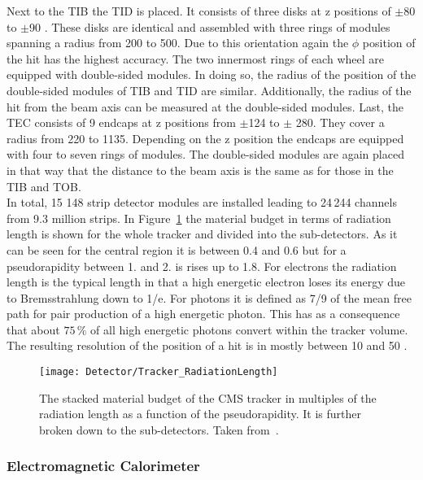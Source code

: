 Next to the TIB the TID is placed. It consists of three disks at z positions of $\pm{}$80 to $\pm$90\cm{} . These disks are identical and assembled with three rings of modules spanning a radius from 200 to 500\mm{}. Due to this orientation again the $\phi{}$ position of the hit has the highest accuracy. The two innermost rings of each wheel are equipped with double-sided modules. In doing so, the radius of the position of the double-sided modules of TIB and TID are similar. Additionally, the radius of the hit from the beam axis can be measured at the double-sided modules. Last, the TEC consists of 9 endcaps at z positions from $\pm{}$124 to $\pm{}$ 280\cm{}. They cover a radius from 220 to 1135\mm{}. Depending on the z position the endcaps are equipped with four to seven rings of modules. The double-sided modules are again placed in that way that the distance to the beam axis is the same as for those in the TIB and TOB. \\
In total, 15 148 strip detector modules are installed leading to 24\,244 channels from 9.3 million strips. In Figure~\ref{plot:LHCCMSTrackerRadiationLength} the material budget in terms of radiation length is shown for the whole tracker and divided into the sub-detectors. As it can be seen for the central region it is between 0.4 and 0.6 but for a pseudorapidity between 1. and 2. is rises up to 1.8. For electrons the radiation length is the typical length in that a high energetic electron loses its energy due to Bremsstrahlung down to 1/e. For photons it is defined as 7/9 of the mean free path for pair production of a high energetic photon. This has as a consequence that about $75\,\%$ of all high energetic photons convert within the tracker volume.\\
The resulting resolution of the position of a hit is in mostly between 10 and 50\mum{} \cite{CMS-PAPER-TRK-11-001}.

\begin{figure}[!Hhtb]
    \centering
    \texttt{[image: Detector/Tracker\_RadiationLength]}
    \caption[Material budget of the CMS Tracker]{The stacked material budget of the CMS tracker in multiples of the radiation length as a function of the pseudorapidity. It is further broken down to the sub-detectors. Taken from~. \label{plot:LHCCMSTrackerRadiationLength}}
\end{figure}

\subsubsection{Electromagnetic Calorimeter}

